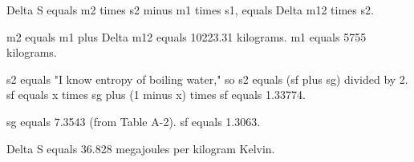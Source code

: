 Delta S equals m2 times s2 minus m1 times s1, equals Delta m12 times s2.  

m2 equals m1 plus Delta m12 equals 10223.31 kilograms.  
m1 equals 5755 kilograms.  

s2 equals "I know entropy of boiling water," so s2 equals (sf plus sg) divided by 2.  
sf equals x times sg plus (1 minus x) times sf equals 1.33774.  

sg equals 7.3543 (from Table A-2).  
sf equals 1.3063.  

Delta S equals 36.828 megajoules per kilogram Kelvin.